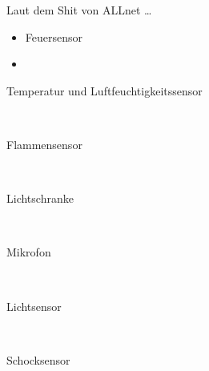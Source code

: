 
Laut dem Shit von ALLnet \cite{ALLNetSensoren} \ldots

\begin{itemize}
\item Feuersensor
\item
\end{itemize}

\begin{description}
\item[Temperatur und Luftfeuchtigkeitssensor] \hfill \\
	
\item[Flammensensor]\hfill \\
\item[Lichtschranke]\hfill \\
\item[Mikrofon]\hfill \\
\item[Lichtsensor]\hfill \\
\item[Schocksensor]\hfill \\
\end{description}